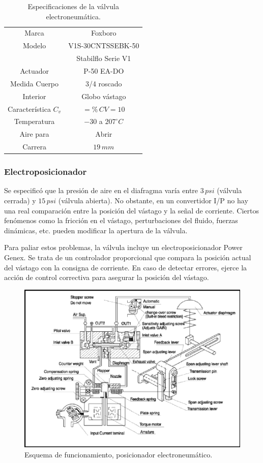 \begin{table}
\centering
 \begin{tabular}{|c|c|}
  \hline
  Marca & Foxboro\\
  Modelo & V1S-30CNTSSEBK-50\\
	& Stabilflo Serie V1\\
 Actuador & P-50 EA-DO\\
 Medida Cuerpo & 3/4 roscado\\
 Interior & Globo vástago\\
 Característica $C_v$ & $=\%\,CV=10$\\
 Temperatura & $-30$ a $207^\circ C$\\
 Aire para & Abrir  \\
 Carrera & $19\,mm$ \\
  \hline
 \end{tabular}
 \caption{Especificaciones de la válvula electroneumática.}
 \label{tab:especifValvs}
\end{table}

\subsubsection{Electroposicionador}
Se especificó que la presión de aire en el diafragma varía entre $3\,psi$
(válvula cerrada) y $15\,psi$ (válvula abierta).
No obstante, en un convertidor I/P no hay una real comparación entre
la posición del vástago y la señal de corriente.
Ciertos fenómenos como la fricción en el vástago, perturbaciones del fluido,
fuerzas dinámicas, etc. pueden modificar la apertura de la válvula.

Para paliar estos problemas, la válvula incluye un electroposicionador Power
Genex.
Se trata de un controlador proporcional que compara la posición actual del
vástago con la consigna de corriente.
En caso de detectar errores, ejerce la acción de control correctiva para
asegurar la posición del vástago.

\begin{figure}[ht]
 \centering
 \includegraphics[scale=1.1]{Cap2-DisenoEnsamblado/images/PG-EPL.pdf}
 \caption{Esquema de funcionamiento, posicionador electroneumático.}
 \label{fig:elp-funcionamiento}
\end{figure}

